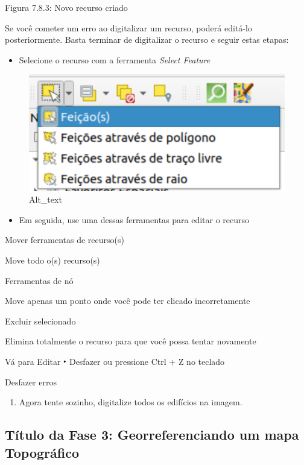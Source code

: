 \documentclass[
]{book}
\providecommand{\tightlist}{%
  \setlength{\itemsep}{0pt}\setlength{\parskip}{0pt}}
\begin{document}
Figura 7.8.3: Novo recurso criado

Se você cometer um erro ao digitalizar um recurso, poderá editá-lo posteriormente. Basta terminar de digitalizar o recurso e seguir estas etapas:

\begin{itemize}
\tightlist
\item
  Selecione o recurso com a ferramenta \emph{Select Feature}
\end{itemize}

\begin{figure}
\centering
\includegraphics{media/modulo7/select-feature.png}
\caption{Alt\_text}
\end{figure}

\begin{itemize}
\tightlist
\item
  Em seguida, use uma dessas ferramentas para editar o recurso
\end{itemize}

Mover ferramentas de recurso(s)

Move todo o(s) recurso(s)

Ferramentas de nó

Move apenas um ponto onde você pode ter clicado incorretamente

Excluir selecionado

Elimina totalmente o recurso para que você possa tentar novamente

Vá para Editar ‣ Desfazer ou pressione Ctrl + Z no teclado

Desfazer erros

\begin{enumerate}
\def\labelenumi{\arabic{enumi}.}
\setcounter{enumi}{16}
\tightlist
\item
  Agora tente sozinho, digitalize todos os edifícios na imagem.
\end{enumerate}

\hypertarget{tuxedtulo-da-fase-3-georreferenciando-um-mapa-topogruxe1fico}{%
\subsection{Título da Fase 3: Georreferenciando um mapa Topográfico}\label{tuxedtulo-da-fase-3-georreferenciando-um-mapa-topogruxe1fico}}
\end{document}
